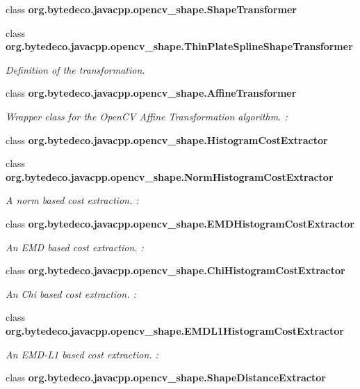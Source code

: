 \begin{DoxyCompactItemize}
\item 
class {\bfseries org.\+bytedeco.\+javacpp.\+opencv\+\_\+shape.\+Shape\+Transformer}
\item 
class {\bfseries org.\+bytedeco.\+javacpp.\+opencv\+\_\+shape.\+Thin\+Plate\+Spline\+Shape\+Transformer}
\begin{DoxyCompactList}\small\item\em Definition of the transformation. \end{DoxyCompactList}\item 
class {\bfseries org.\+bytedeco.\+javacpp.\+opencv\+\_\+shape.\+Affine\+Transformer}
\begin{DoxyCompactList}\small\item\em Wrapper class for the Open\+CV Affine Transformation algorithm. \+: \end{DoxyCompactList}\item 
class {\bfseries org.\+bytedeco.\+javacpp.\+opencv\+\_\+shape.\+Histogram\+Cost\+Extractor}
\item 
class {\bfseries org.\+bytedeco.\+javacpp.\+opencv\+\_\+shape.\+Norm\+Histogram\+Cost\+Extractor}
\begin{DoxyCompactList}\small\item\em A norm based cost extraction. \+: \end{DoxyCompactList}\item 
class {\bfseries org.\+bytedeco.\+javacpp.\+opencv\+\_\+shape.\+E\+M\+D\+Histogram\+Cost\+Extractor}
\begin{DoxyCompactList}\small\item\em An E\+MD based cost extraction. \+: \end{DoxyCompactList}\item 
class {\bfseries org.\+bytedeco.\+javacpp.\+opencv\+\_\+shape.\+Chi\+Histogram\+Cost\+Extractor}
\begin{DoxyCompactList}\small\item\em An Chi based cost extraction. \+: \end{DoxyCompactList}\item 
class {\bfseries org.\+bytedeco.\+javacpp.\+opencv\+\_\+shape.\+E\+M\+D\+L1\+Histogram\+Cost\+Extractor}
\begin{DoxyCompactList}\small\item\em An E\+M\+D-\/\+L1 based cost extraction. \+: \end{DoxyCompactList}\item 
class {\bfseries org.\+bytedeco.\+javacpp.\+opencv\+\_\+shape.\+Shape\+Distance\+Extractor}

\end{DoxyCompactItemize}
